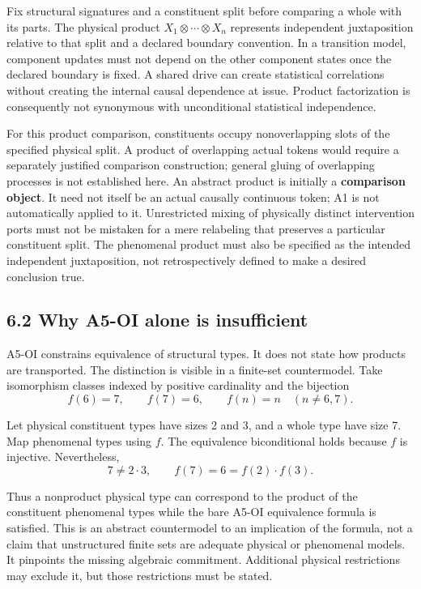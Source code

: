 \documentclass[
  11pt,
  a4paper,
]{article}
\begin{document}
Fix structural signatures and a constituent split before comparing a
whole with its parts. The physical product
\(X_1\otimes\cdots\otimes X_n\) represents independent juxtaposition
relative to that split and a declared boundary convention. In a
transition model, component updates must not depend on the other
component states once the declared boundary is fixed. A shared drive can
create statistical correlations without creating the internal causal
dependence at issue. Product factorization is consequently not
synonymous with unconditional statistical independence.

For this product comparison, constituents occupy nonoverlapping slots of
the specified physical split. A product of overlapping actual tokens
would require a separately justified comparison construction; general
gluing of overlapping processes is not established here. An abstract
product is initially a \textbf{comparison object}. It need not itself be
an actual causally continuous token; A1 is not automatically applied to
it. Unrestricted mixing of physically distinct intervention ports must
not be mistaken for a mere relabeling that preserves a particular
constituent split. The phenomenal product must also be specified as the
intended independent juxtaposition, not retrospectively defined to make
a desired conclusion true.

\hypertarget{why-a5-oi-alone-is-insufficient}{%
\subsection{6.2 Why A5-OI alone is
insufficient}\label{why-a5-oi-alone-is-insufficient}}

A5-OI constrains equivalence of structural types. It does not state how
products are transported. The distinction is visible in a finite-set
countermodel. Take isomorphism classes indexed by positive cardinality
and the bijection
\nopagebreak[4]
\[
f(6)=7,\qquad f(7)=6,\qquad f(n)=n\quad(n\ne6,7).
\]

Let physical constituent types have sizes 2 and 3, and a whole type have
size 7. Map phenomenal types using \(f\). The equivalence biconditional
holds because \(f\) is injective. Nevertheless,
\nopagebreak[4]
\[
7\ne2\cdot3,\qquad f(7)=6=f(2)\cdot f(3).
\]

Thus a nonproduct physical type can correspond to the product of the
constituent phenomenal types while the bare A5-OI equivalence formula is
satisfied. This is an abstract countermodel to an implication of the
formula, not a claim that unstructured finite sets are adequate physical
or phenomenal models. It pinpoints the missing algebraic commitment.
Additional physical restrictions may exclude it, but those restrictions
must be stated.
\end{document}
